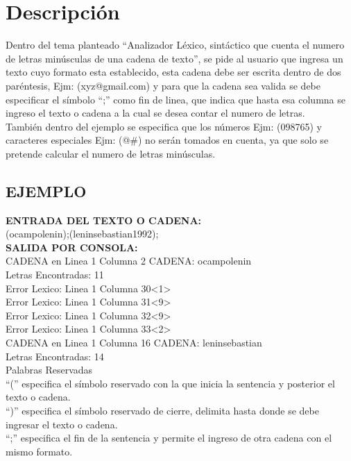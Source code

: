 \documentclass[a4paper,openright,12pt]{article}
\begin{document}
\section{Descripción}

Dentro del tema planteado “Analizador Léxico, sintáctico que cuenta el numero de letras minúsculas de una cadena de texto”, se pide al usuario que ingresa un texto cuyo formato esta establecido, esta cadena debe ser escrita dentro de dos paréntesis, Ejm: (xyz@gmail.com) y para que la cadena sea valida se debe especificar el símbolo “;” como fin de linea, que indica que hasta esa columna se ingreso el texto o cadena a la cual se desea contar el numero de letras.\\
También dentro del ejemplo se especifica que los números Ejm: (098765) y caracteres especiales  Ejm: (@\#)  no serán tomados en cuenta, ya que solo se pretende calcular el numero de letras minúsculas.

\subsection{EJEMPLO}

\textbf{ENTRADA DEL TEXTO O CADENA:}
\\

(ocampolenin);(leninsebastian1992);
\\
\textbf{SALIDA POR CONSOLA:}\\

CADENA en Linea 1 Columna 2 CADENA: ocampolenin\\
Letras Encontradas: 11\\
Error Lexico: Linea 1 Columna 30<1> \\
Error Lexico: Linea 1 Columna 31<9> \\
Error Lexico: Linea 1 Columna 32<9> \\
Error Lexico: Linea 1 Columna 33<2> \\
CADENA en Linea 1 Columna 16 CADENA: leninsebastian\\
Letras Encontradas: 14\\


Palabras Reservadas\\

“(”  especifica el símbolo reservado con la que inicia la sentencia y posterior el texto o cadena.\\
“)”  especifica el símbolo reservado de cierre, delimita hasta donde se debe ingresar el texto o cadena.\\
“;”  especifica el fin de la sentencia y permite el ingreso de otra cadena con el mismo formato.
\end{document}
